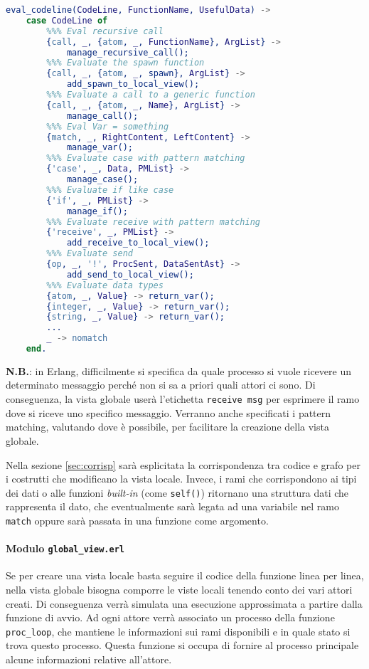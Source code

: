 \bigskip

\begin{lstlisting}[language=Erlang, caption=Codice di \texttt{eval\_codeline}, label=code:eval]
eval_codeline(CodeLine, FunctionName, UsefulData) ->
    case CodeLine of
        %%% Eval recursive call
        {call, _, {atom, _, FunctionName}, ArgList} ->
            manage_recursive_call();
        %%% Evaluate the spawn function
        {call, _, {atom, _, spawn}, ArgList} ->
            add_spawn_to_local_view();
        %%% Evaluate a call to a generic function
        {call, _, {atom, _, Name}, ArgList} ->
            manage_call();
        %%% Eval Var = something
        {match, _, RightContent, LeftContent} ->
            manage_var();
        %%% Evaluate case with pattern matching
        {'case', _, Data, PMList} ->
            manage_case();
        %%% Evaluate if like case
        {'if', _, PMList} ->
            manage_if();
        %%% Evaluate receive with pattern matching
        {'receive', _, PMList} ->
            add_receive_to_local_view();
        %%% Evaluate send
        {op, _, '!', ProcSent, DataSentAst} ->
            add_send_to_local_view();
        %%% Evaluate data types
        {atom, _, Value} -> return_var();
        {integer, _, Value} -> return_var();
        {string, _, Value} -> return_var();
        ...
        _ -> nomatch
    end.
\end{lstlisting}

\textbf{N.B.}: in Erlang, difficilmente si specifica da quale processo si vuole ricevere un determinato messaggio perch\'e non si sa a priori quali attori ci sono. Di conseguenza, la vista globale user\`a l'etichetta \texttt{receive msg} per esprimere il ramo dove si riceve uno specifico messaggio. Verranno anche specificati i pattern matching, valutando dove \`e possibile, per facilitare la creazione della vista globale.

\bigskip

Nella sezione \ref{sec:corrisp} sar\`a esplicitata la corrispondenza tra codice e grafo per i costrutti che modificano la vista locale. Invece, i rami che corrispondono ai tipi dei dati o alle funzioni \textit{built-in} (come \texttt{self()}) ritornano una struttura dati che rappresenta il dato, che eventualmente sar\`a legata ad una variabile nel ramo \texttt{match} oppure sar\`a passata in una funzione come argomento.

\paragraph{Modulo \texttt{global\_view.erl}}
Se per creare una vista locale basta seguire il codice della funzione linea per linea, nella vista globale bisogna comporre le viste locali tenendo conto dei vari attori creati. Di conseguenza verr\`a simulata una esecuzione approssimata a partire dalla funzione di avvio. Ad ogni attore verr\`a associato un processo della funzione \texttt{proc\_loop}, che mantiene le informazioni sui rami disponibili e in quale stato si trova questo processo. Questa funzione si occupa di fornire al processo principale alcune informazioni relative all'attore.

